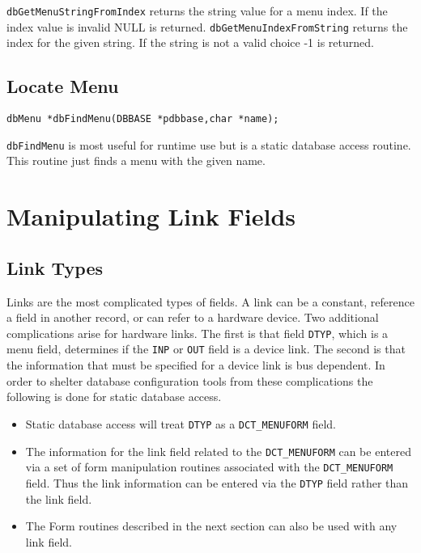 \verb|dbGetMenuStringFromIndex| returns the string value for a menu index.
If the index value is invalid NULL is returned.
\verb|dbGetMenuIndexFromString| returns the index for the given string.
If the string is not a valid choice -1 is returned.

\subsection{Locate Menu}

\begin{verbatim}
dbMenu *dbFindMenu(DBBASE *pdbbase,char *name);
\end{verbatim}

\verb|dbFindMenu| is most useful for runtime use but is a static database access routine.
This routine just finds a menu with the given name.

\section{Manipulating Link Fields}

\subsection{Link Types}

Links are the most complicated types of fields.
A link can be a constant, reference a field in another record, or can refer to a hardware device.
Two additional complications arise for hardware links.
The first is that field \verb|DTYP|, which is a menu field, determines if the \verb|INP| or \verb|OUT| field is a device link.
The second is that the information that must be specified for a device link is bus dependent.
In order to shelter database configuration tools from these complications the following is done for static database access.

\begin{itemize}
\item Static database access will treat \verb|DTYP| as a \verb|DCT_MENUFORM| field.

\item The information for the link field related to the \verb|DCT_MENUFORM| can be entered via a set of form manipulation routines associated with the \verb|DCT_MENUFORM| field.
Thus the link information can be entered via the \verb|DTYP| field rather than the link field.

\item The Form routines described in the next section can also be used with any link field.

\end{itemize}

